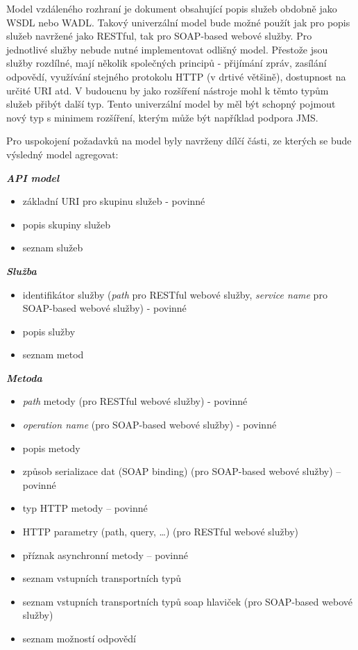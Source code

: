 \documentclass[11pt,twoside,a4paper]{book}
\begin{document}
Model vzdáleného rozhraní je dokument obsahující popis služeb obdobně jako WSDL
nebo WADL. Takový univerzální model bude možné použít jak pro popis služeb
navržené jako RESTful, tak pro SOAP-based webové služby. Pro jednotlivé služby
nebude nutné implementovat odlišný model. Přestože jsou služby rozdílné, mají
několik společných principů - přijímání zpráv, zasílání odpovědí, využívání
stejného protokolu HTTP (v drtivé většině), dostupnost na určité URI atd. V
budoucnu by jako rozšíření nástroje mohl k těmto typům služeb přibýt další typ.
Tento univerzální model by měl být schopný pojmout nový typ s minimem rozšíření,
kterým může být například podpora JMS.

Pro uspokojení požadavků na model byly navrženy dílčí části, ze kterých se bude
výsledný model agregovat:

\textbf{\textit{API model}}

\begin{itemize}
  \item základní URI pro skupinu služeb - povinné
  \item popis skupiny služeb
  \item seznam služeb
\end{itemize}

\textbf{\textit{Služba}}

\begin{itemize}
  \item identifikátor služby ({\em path} pro RESTful webové služby, {\em service
  name} pro SOAP-based webové služby) - povinné
  \item popis služby
  \item seznam metod
\end{itemize}

\textbf{\textit{Metoda}}

\begin{itemize}
  \item {\em path} metody (pro RESTful webové služby) - povinné
  \item {\em operation name} (pro SOAP-based webové služby) - povinné
  \item popis metody
  \item způsob serializace dat (SOAP binding) (pro SOAP-based webové služby) – povinné
  \item typ HTTP metody – povinné
  \item HTTP parametry (path, query, \ldots) (pro RESTful webové služby)
  \item příznak asynchronní metody – povinné
  \item seznam vstupních transportních typů
  \item seznam vstupních transportních typů soap hlaviček (pro SOAP-based webové služby)
  \item seznam možností odpovědí
\end{itemize}
\end{document}
